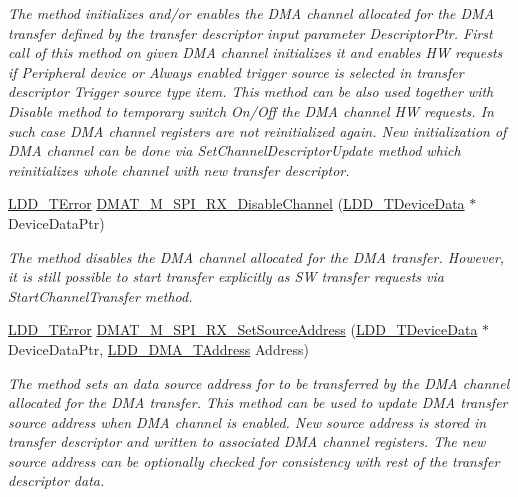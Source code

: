\begin{DoxyCompactItemize}
\begin{DoxyCompactList}\small\item\em The method initializes and/or enables the D\-M\-A channel allocated for the D\-M\-A transfer defined by the transfer descriptor input parameter Descriptor\-Ptr. First call of this method on given D\-M\-A channel initializes it and enables H\-W requests if Peripheral device or Always enabled trigger source is selected in transfer descriptor Trigger source type item. This method can be also used together with Disable method to temporary switch On/\-Off the D\-M\-A channel H\-W requests. In such case D\-M\-A channel registers are not reinitialized again. New initialization of D\-M\-A channel can be done via Set\-Channel\-Descriptor\-Update method which reinitializes whole channel with new transfer descriptor. \end{DoxyCompactList}\item 
\hyperlink{group___p_e___types__module_ga24c2b045fd04e79e85f261ce4df35588}{L\-D\-D\-\_\-\-T\-Error} \hyperlink{group___d_m_a_t___m___s_p_i___r_x__module_ga9b4e1d431dc3f67f2e9e4a52486ba2f2}{D\-M\-A\-T\-\_\-\-M\-\_\-\-S\-P\-I\-\_\-\-R\-X\-\_\-\-Disable\-Channel} (\hyperlink{group___p_e___types__module_gac5cf1362f1f0e3a2ce71b1bf2276d091}{L\-D\-D\-\_\-\-T\-Device\-Data} $\ast$Device\-Data\-Ptr)
\begin{DoxyCompactList}\small\item\em The method disables the D\-M\-A channel allocated for the D\-M\-A transfer. However, it is still possible to start transfer explicitly as S\-W transfer requests via Start\-Channel\-Transfer method. \end{DoxyCompactList}\item 
\hyperlink{group___p_e___types__module_ga24c2b045fd04e79e85f261ce4df35588}{L\-D\-D\-\_\-\-T\-Error} \hyperlink{group___d_m_a_t___m___s_p_i___r_x__module_gae7eb2ac56c2a0231dc8509c53c2a8d0b}{D\-M\-A\-T\-\_\-\-M\-\_\-\-S\-P\-I\-\_\-\-R\-X\-\_\-\-Set\-Source\-Address} (\hyperlink{group___p_e___types__module_gac5cf1362f1f0e3a2ce71b1bf2276d091}{L\-D\-D\-\_\-\-T\-Device\-Data} $\ast$Device\-Data\-Ptr, \hyperlink{group___p_e___types__module_gab8287f62db7ff96992355760b652cd07}{L\-D\-D\-\_\-\-D\-M\-A\-\_\-\-T\-Address} Address)
\begin{DoxyCompactList}\small\item\em The method sets an data source address for to be transferred by the D\-M\-A channel allocated for the D\-M\-A transfer. This method can be used to update D\-M\-A transfer source address when D\-M\-A channel is enabled. New source address is stored in transfer descriptor and written to associated D\-M\-A channel registers. The new source address can be optionally checked for consistency with rest of the transfer descriptor data. \end{DoxyCompactList}\item 

\end{DoxyCompactItemize}

